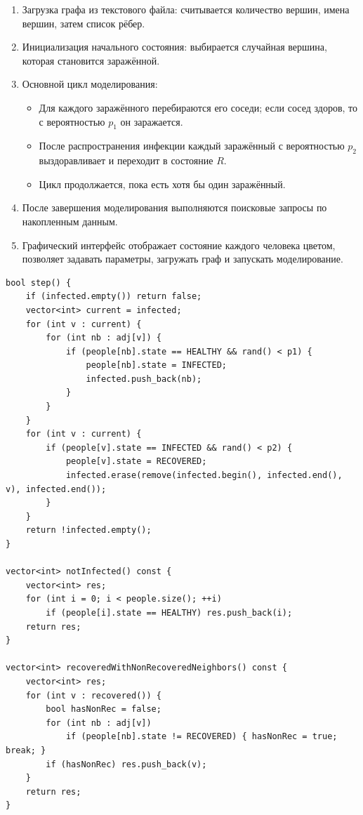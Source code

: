 \documentclass[a4paper]{article}
\theoremstyle{definition}
\begin{document}
\begin{enumerate}
    \item Загрузка графа из текстового файла: считывается количество вершин, имена вершин, затем список рёбер.
    \item Инициализация начального состояния: выбирается случайная вершина, которая становится заражённой.
    \item Основной цикл моделирования:
        \begin{itemize}
            \item Для каждого заражённого перебираются его соседи; если сосед здоров, то с вероятностью $p_1$ он заражается.
            \item После распространения инфекции каждый заражённый с вероятностью $p_2$ выздоравливает и переходит в состояние $R$.
            \item Цикл продолжается, пока есть хотя бы один заражённый.
        \end{itemize}
    \item После завершения моделирования выполняются поисковые запросы по накопленным данным.
    \item Графический интерфейс отображает состояние каждого человека цветом, позволяет задавать параметры, загружать граф и запускать моделирование.
\end{enumerate}

\begin{lstlisting}[caption={Основной алгоритм моделирования эпидемии}, label=lst2]
bool step() {
    if (infected.empty()) return false;
    vector<int> current = infected;
    for (int v : current) {
        for (int nb : adj[v]) {
            if (people[nb].state == HEALTHY && rand() < p1) {
                people[nb].state = INFECTED;
                infected.push_back(nb);
            }
        }
    }
    for (int v : current) {
        if (people[v].state == INFECTED && rand() < p2) {
            people[v].state = RECOVERED;
            infected.erase(remove(infected.begin(), infected.end(), v), infected.end());
        }
    }
    return !infected.empty();
}

vector<int> notInfected() const {
    vector<int> res;
    for (int i = 0; i < people.size(); ++i)
        if (people[i].state == HEALTHY) res.push_back(i);
    return res;
}

vector<int> recoveredWithNonRecoveredNeighbors() const {
    vector<int> res;
    for (int v : recovered()) {
        bool hasNonRec = false;
        for (int nb : adj[v])
            if (people[nb].state != RECOVERED) { hasNonRec = true; break; }
        if (hasNonRec) res.push_back(v);
    }
    return res;
}
\end{lstlisting}
\end{document}
